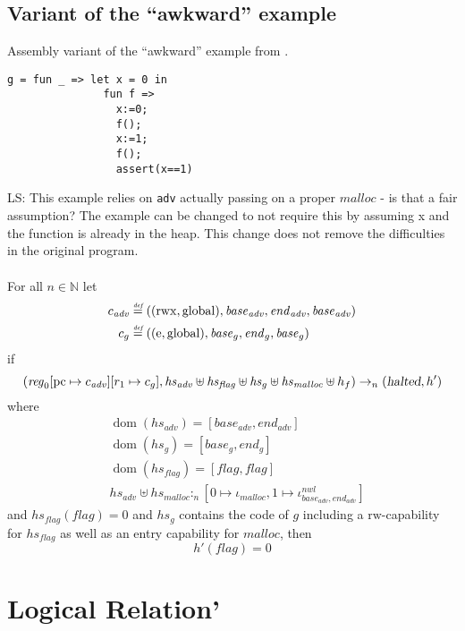\documentclass[a4paper]{article}
\newcommand{\forcenewline}{$\phantom{v}$\\}
\newcommand{\update}[2]{[#1 \mapsto #2]}
\newcommand{\defeq}{\stackrel{\textit{\tiny{def}}}{=}}
\DeclareMathOperator{\dom}{dom}
\newcommand\lau[1]{{\color{purple} \sf \footnotesize {LS: #1}}\\}
\newcommand{\var}[1]{\mathit{#1}}
\newcommand{\hs}{\var{hs}}
\newcommand{\pcreg}{\mathrm{pc}}
\newcommand{\start}{\var{base}}
\newcommand{\addrend}{\var{end}}
\newcommand{\reg}{\var{reg}}
\newcommand{\heap}{\var{heap}}
\newcommand{\adv}{\var{adv}}
\newcommand{\flag}{\var{flag}}
\newcommand{\halted}{\textsl{halted}}
\newcommand{\heapSat}[3][\heap]{#1 :_{#2} #3}
\newcommand{\codelabel}[1]{\mathit{#1}}
\newcommand{\malloc}{\codelabel{malloc}}
\newcommand{\nats}{\mathbb{N}}
\newcommand{\plainperm}[1]{\mathrm{#1}}
\newcommand{\readwrite}{\plainperm{rw}}
\newcommand{\entry}{\plainperm{e}}
\newcommand{\rwx}{\plainperm{rwx}}
\newcommand{\glob}{\plainperm{global}}
\newcommand{\step}[1][]{\rightarrow_{#1}}
\begin{document}
\subsection{Variant of the ``awkward'' example}
Assembly variant of the ``awkward'' example from \citep[p.~11]{Dreyer:2010:IHS:1863543.1863566}. 
\begin{verbatim}
g = fun _ => let x = 0 in
               fun f =>
                 x:=0;
                 f();
                 x:=1;
                 f();
                 assert(x==1)
\end{verbatim}
\lau{ This example relies on \texttt{adv} actually passing on a proper $\malloc$ - is that a fair assumption? The example can be changed to not require this by assuming x and the function is already in the heap. This change does not remove the difficulties in the original program. }
\begin{lemma}\forcenewline
  For all $n \in \nats$
  let
  \begin{align*}
    c_{\var{adv}} & \defeq ((\rwx,\glob),\start_{\adv},\addrend_{\adv},\start_{\adv}) \\
    c_{g} & \defeq ((\entry,\glob),\start_g,\addrend_g,\start_g)
  \end{align*}
if
  \[
    (\reg_0\update{\pcreg}{c_{\adv}}
          \update{r_1}{c_g},\hs_{\adv} \uplus \hs_{\flag} \uplus \hs_{g} \uplus \hs_{\malloc} \uplus h_f) \step[n] (\halted,h')
  \]
where 
\begin{align*}
  &\dom(hs_{\adv}) = [\start_\adv,\addrend_\adv] \\
  &\dom(hs_g) = [\start_g,\addrend_g] \\
  &\dom(hs_\flag) = [\flag,\flag] \\
  &\heapSat[\hs_{\adv} \uplus \hs_{\malloc}]{n}{[0 \mapsto \iota_{\malloc}, 1 \mapsto\iota^{\var{nwl}}_{\start_\adv,\addrend_\adv}]}
\end{align*}
and $hs_\flag(\flag) = 0$ and $hs_g$ contains the code of $g$ including a $\readwrite$-capability for $\hs_\flag$ as well as an entry capability for $\malloc$, 
then
\[
  h'(\flag) = 0
\]
\end{lemma}


\section{Logical Relation'}
\end{document}
